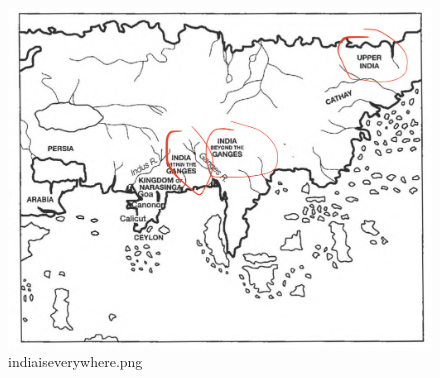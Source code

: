 \documentclass[letterpaper]{article}
\begin{document}
\begin{figure}[htbp]
\centering
\includegraphics[width=.9\linewidth]{indiaiseverywhere.png}
\caption{indiaiseverywhere.png}
\end{figure}
\end{document}
